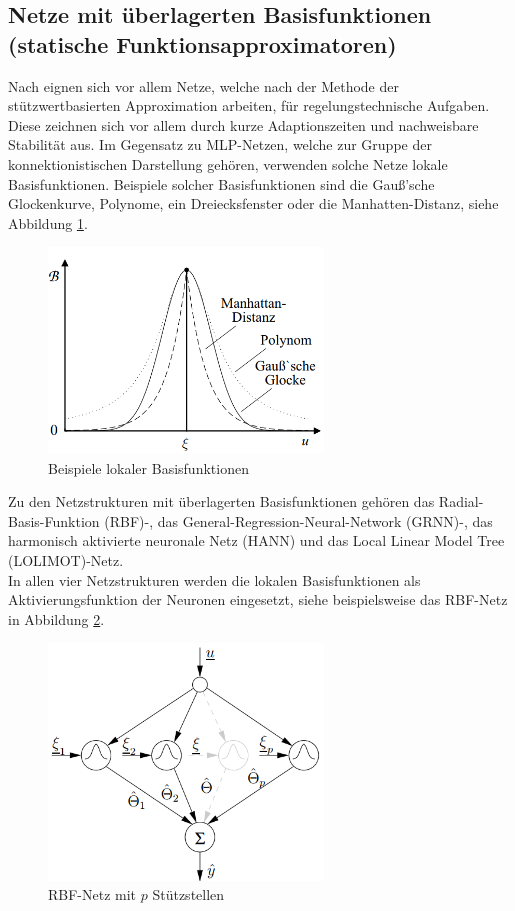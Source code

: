 \subsection{Netze mit überlagerten Basisfunktionen (statische Funktionsapproximatoren)}

Nach \cite{Schroder.2010} eignen sich vor allem Netze, welche nach der Methode der stützwertbasierten Approximation arbeiten, für regelungstechnische Aufgaben. Diese zeichnen sich vor allem durch kurze Adaptionszeiten und nachweisbare Stabilität aus. Im Gegensatz zu MLP-Netzen, welche zur Gruppe der konnektionistischen Darstellung gehören, verwenden solche Netze lokale Basisfunktionen. Beispiele solcher Basisfunktionen sind die Gauß'sche Glockenkurve, Polynome, ein Dreiecksfenster oder die Manhatten-Distanz, siehe Abbildung \ref{fig:basisfunktionen}.

\begin{figure} [H]
	\centering
	\includegraphics[width=0.65\textwidth]{images/basisfunktionen}
	\caption{Beispiele lokaler Basisfunktionen \cite{Schroder.2010}}
	\label{fig:basisfunktionen}
\end{figure}


Zu den Netzstrukturen mit überlagerten Basisfunktionen gehören das Radial-Basis-Funktion (RBF)-, das General-Regression-Neural-Network (GRNN)-, das harmonisch aktivierte neuronale Netz (HANN) und das Local Linear Model Tree (LOLIMOT)-Netz. \\

In allen vier Netzstrukturen werden die lokalen Basisfunktionen als Aktivierungsfunktion der Neuronen eingesetzt, siehe beispielsweise das RBF-Netz in Abbildung \ref{fig:rbf}.

\begin{figure} [H]
	\centering
	\includegraphics[width=0.65\textwidth]{images/rbf}
	\caption{RBF-Netz mit $p$ Stützstellen  \cite{Schroder.2010}}
	\label{fig:rbf}
\end{figure}


